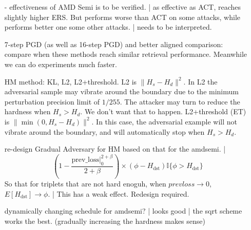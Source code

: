 \begin{enumerate}

	\item [-] effectiveness of AMD Semi is to be verified. | as effective
		as ACT, reaches slightly higher ERS. But performs worse than ACT on
		some attacks, while performs better one some other attacks. | needs to
		be interpreted.

	\item [\cmark] 7-step PGD (as well as 16-step PGD) and better aligned comparison:
		compare when these methods reach similar retrieval performance.
		Meanwhile we can do experiments much faster.

	\item [\cmark] HM method: KL, L2, L2+threshold. L2 is $\|H_s-H_d\|^2$.
		In L2 the adversarial sample may vibrate around the boundary due to
		the minimum perturbation precision limit of $1/255$. The attacker
		may turn to reduce the hardness when $H_s>H_d$. We don't want that
		to happen.  L2+threshold (ET) is $\|\min(0,H_s-H_d)\|^2$. In this case,
		the adversarial example will not vibrate around the boundary, and will
		automatically stop when $H_s>H_d$.

	\item [\xmark] re-design Gradual Adversary for HM based on that for the amdsemi. |
		\[
			(1-\frac{\text{prev\_loss}|_0^{2+\beta}}{2+\beta}) \times
			(\phi - H_\text{dst})\mathbb{I}\{\phi > H_\text{dst}\}
		\]
		So that for triplets that are not hard enoguh, when
		$prevloss \rightarrow 0$, $E[H_\text{dst}]\rightarrow \phi$.
		| This has a weak effect. Redesign required.
	
	\item [\cmark] \checkmark dynamically changing schedule for amdsemi? |
		looks good | the sqrt scheme works the best. (gradually increasing the
		hardness makes sense)

\end{enumerate}
